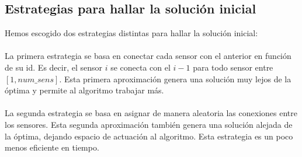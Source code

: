 \subsection{Estrategias para hallar la solución inicial}


Hemos escogido dos estrategias distintas para hallar la solución inicial:

\paragraph{}

La primera estrategia se basa en conectar cada sensor con el anterior
en función de su id. Es decir, el sensor $i$ se conecta con el $i-1$ para
todo sensor entre $[1, num\_sens]$. Esta primera aproximación genera una
solución muy lejos de la óptima y permite al algoritmo trabajar más.

\paragraph{}

La segunda estrategia se basa en asignar de manera aleatoria las conexiones
entre los sensores. Esta segunda aproximación también genera una solución
alejada de la óptima, dejando espacio de actuación al algoritmo. Esta 
estrategia es un poco menos eficiente en tiempo. 
